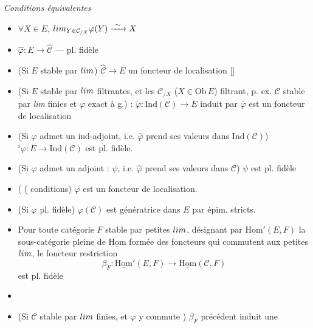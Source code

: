 \documentclass[11pt,a4paper]{article}
\begin{document}
\emph{Conditions équivalentes}
\begin{itemize}
  \item[a)] $\forall X \in E$, $\varinjlim_{Y \in \mathcal{C}_{/X}}
    \varphi(Y) \xrightarrow{\ \sim\ } X$
  \item[b)] $\hat{\varphi} : E \to \hat{\mathcal{C}}$ — pl. fidèle
\end{itemize}
\begin{itemize}
  \item[b')] (Si $E$ stable par  $\varinjlim$) $\hat{\mathcal{C}}
    \to E$ un foncteur de localisation []
  \item[c')] \struck{\ill{}} (Si $E$ stable par  $\varinjlim$
    filtrantes, et les $\mathcal{C}_{/X}$ ($X \in \mathrm{Ob}\,E$) filtrant,
    p. ex. $\mathcal{C}$ stable par \emph{lim} finies et $\varphi$
    exact à g.) : $\tilde{\varphi} : \mathrm{Ind}(\mathcal{C}) \to E$ induit
    par $\bar{\varphi}$ est un foncteur de localisation
  \item[c)] (Si $\varphi$ admet un ind-adjoint, i.e. $\hat{\varphi}$ prend
    ses valeurs dans $\mathrm{Ind}(\mathcal{C})$) ${}^{i}\varphi : E \to
    \mathrm{Ind}(\mathcal{C})$ est pl. fidèle.
  \item[d)] (Si $\varphi$ admet un adjoint : \ill{} $\psi$, i.e.
    $\hat{\varphi}$ prend ses valeurs dans $\mathcal{C}$) $\psi$ est pl.
    fidèle
  \item[d')]  (
    (\ill{} conditions) $\varphi$ est un foncteur de localisation.
  \item[e)] (Si $\varphi$ pl. fidèle) $\varphi(\mathcal{C})$ est génératrice
    dans $E$ par épim. stricts.
  \item[f)] Pour toute catégorie $F$ stable par petites $\varinjlim$,
    désignant par $\underline{\mathrm{Hom}}'(E, F)$ la sous-catégorie pleine
    de $\underline{\mathrm{Hom}}$ formée des foncteurs qui commutent aux
    petites $\varinjlim$, le foncteur restriction
    \[
      \beta_{F} : \underline{\mathrm{Hom}}'(E, F) \longrightarrow
      \underline{\mathrm{Hom}}(\mathcal{C}, F)
    \]
    est pl. fidèle
  \item[g')] 
  \item[g)] (Si $\mathcal{C}$ stable par $\varinjlim$ finies, et $\varphi$
    y commute ) $\beta_{F}$ précédent induit une

\end{itemize}
\end{document}
